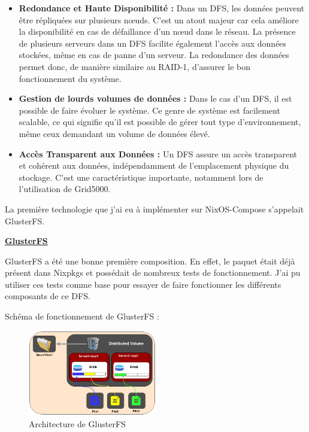 \documentclass[a4paper,french,12pt, titlepage]{article}
\begin{document}
\begin{itemize}
\item
  \textbf{Redondance et Haute Disponibilité :} Dans un DFS, les données
  peuvent être répliquées sur plusieurs nœuds. C'est un atout majeur car
  cela améliore la disponibilité en cas de défaillance d'un nœud dans le
  réseau. La présence de plusieurs serveurs dans un DFS facilite
  également l'accès aux données stockées, même en cas de panne d'un
  serveur. La redondance des données permet donc, de manière similaire
  au RAID-1, d'assurer le bon fonctionnement du système.
\item
  \textbf{Gestion de lourds volumes de données :} Dans le cas d'un DFS,
  il est possible de faire évoluer le système. Ce genre de système est
  facilement scalable, ce qui signifie qu'il est possible de gérer tout
  type d'environnement, même ceux demandant un volume de données élevé.
\item
  \textbf{Accès Transparent aux Données :} Un DFS assure un accès
  transparent et cohérent aux données, indépendamment de l'emplacement
  physique du stockage. C'est une caractéristique importante, notamment
  lors de l'utilisation de Grid5000.\newline
\end{itemize}

La première technologie que j'ai eu à implémenter sur NixOS-Compose
s'appelait GlusterFS.\newline

\textbf{\href{https://www.gluster.org/}{GlusterFS} \cite{glusterfs2012}}

GlusterFS a été une bonne première composition. En effet, le paquet
était déjà présent dans Nixpkgs et possédait de nombreux tests de
fonctionnement. J'ai pu utiliser ces tests comme base pour essayer de
faire fonctionner les différents composants de ce DFS.\newline

Schéma de fonctionnement de GlusterFS :

\begin{figure}[h]
\centering
\includegraphics[width=0.5\textwidth,height=0.5\textheight,keepaspectratio]{images/shema-gluster.png}
\caption{Architecture de GlusterFS}
\end{figure}
\end{document}
